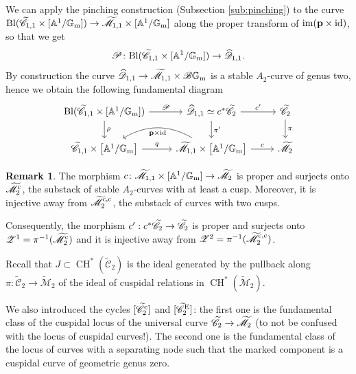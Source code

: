 \documentclass[a4paper, 10pt]{amsart}
\numberwithin{equation}{section}
\numberwithin{subsection}{section}
\theoremstyle{definition}
\newtheorem{remark}[theorem]{Remark}
\theoremstyle{remark}
\renewcommand{\mathcal}{\mathscr}
\renewcommand\AA{\mathbb{A}} \newcommand\BB{\mathbb{B}}
\newcommand\GG{\mathbb{G}} \newcommand\HH{\mathbb{H}}
\newcommand\rmm{\mathrm{m}} \newcommand\rmn{\mathrm{n}}
\newcommand\arr{\ifinner\to\else\longrightarrow\fi}
\newcommand\im[1]{\operatorname{im}(#1)}
\newcommand{\gm}{\GG_{\rmm}}
\newcommand{\Mtilde}{\widetilde{\mathcal M}}
\newcommand{\Ctilde}{\widetilde{\mathcal C}}
\newcommand{\ch}[1][*]{\operatorname{CH}^{#1}}
\begin{document}
	We can apply the pinching construction (Subsection \ref{sub:pinching}) to the curve $\rm{Bl}(\Ctilde_{1,1}\times [\AA^1/\gm])\arr \Mtilde_{1,1}\times [\AA^1/\gm]$ along the proper transform of $\im{\bfp\times\rm{id}}$, so that we get
	\[ \cP\colon\rm{Bl}(\Ctilde_{1,1}\times [\AA^1/\gm])\arr \widehat{\cD}_{1,1}.  \]
	By construction the curve $\widehat{\cD}_{1,1}\arr\Mtilde_{1,1}\times\cB\gm$ is a stable $A_2$-curve of genus two, hence we obtain the following fundamental diagram
	\begin{equation}\label{eq:fund diag Z1}
		\begin{tikzcd}
			\rm{Bl}(\Ctilde_{1,1}\times [\AA^1/\gm]) \ar[r, "\cP"] \ar[d, "\rho"]  & \widehat{\cD}_{1,1}\simeq c^*\Ctilde_{2} \ar[r, "c'"] \ar[d, "\pi'"] & \Ctilde_2 \ar[d, "\pi"] \\
			\Ctilde_{1,1}\times \left[\AA^1/\gm\right] \ar[r, "q"] & \Mtilde_{1,1}\times\left[\AA^1/\gm\right] \ar[r, "c"]  \ar[l, bend right, "\bfp\times\rm{id}"]  & \Mtilde_2
		\end{tikzcd}
	\end{equation}
	\begin{remark}
		The morphism $c\colon\Mtilde_{1,1}\times [\AA^1/\gm]\arr\Mtilde_2$ is proper and surjects onto $\Mtilde_2^{\rm c}$, the substack of stable $A_2$-curves with at least a cusp. Moreover, it is injective away from $\Mtilde_2^{\rm{c,c}}$, the substack of curves with two cusps.
		
		Consequently, the morphism $c':c^*\Ctilde_2 \arr \Ctilde_2$ is proper and surjects onto $\cZ^1=\pi^{-1}(\Mtilde_2^{\rm c})$ and it is injective away from $\cZ^2=\pi^{-1}(\Mtilde_2^{\rm{c,c}})$.
	\end{remark}
	Recall that $J\subset\ch(\Ctilde_2)$ is the ideal generated by the pullback along $\pi\colon\Ctilde_2\to\Mtilde_2$ of the ideal of cuspidal relations in $\ch(\Mtilde_2)$.
	
	We also introduced the cycles $[\Ctilde_2^{\rm c}]$ and $[\Ctilde_2^{\rm E}]$: the first one is the fundamental class of the cuspidal locus of the universal curve $\Ctilde_2\arr \Mtilde_2$ (to not be confused with the locus of cuspidal curves!). The second one is the fundamental class of the locus of curves with a separating node such that the marked component is a cuspidal curve of geometric genus zero.
	
\end{document}
